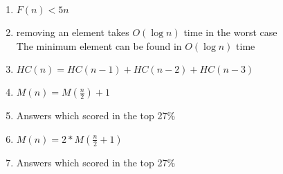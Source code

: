 \documentclass[11pt]{article}
\begin{document}
\begin{enumerate}
    \item $F(n) < 5n$
    \item 
    removing an element takes $O(\log{n})$ time in the worst case\\
    The minimum element can be found in $O(\log{n})$ time
    \item $HC(n) = HC(n-1) + HC(n-2) + HC(n-3)$
    \item $M(n) = M(\frac{n}{2}) + 1$
    \item Answers which scored in the top 27\%
    \item $M(n) = 2 * M(\frac{n}{2} + 1)$
    \item Answers which scored in the top 27\%
\end{enumerate}
\end{document}
